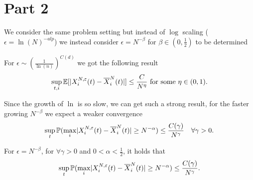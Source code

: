 \section{Part 2}
We consider the same problem setting but instead of $\log$ scaling ($\epsilon = \ln(N)^{-alp} $) we instead consider $\epsilon = N^{-\beta } $ for $\beta  \in  (0,\frac{1}{2})$ to be determined
\begin{remark}
  For $\epsilon \sim (\frac{1}{\ln(n)})^{C(d)} $ we got the following result
 \begin{align*}
   \sup_{t,i} \mathbb{E}[\lvert X^{N,\varepsilon}_i(t) - \overline{X}^{N}_i(t)\rvert ] \le  \frac{C}{N^{\eta } } \text{ for some } \eta  \in (0,1)
 .\end{align*} 
\end{remark}
\begin{remark}
 Since the growth of $\ln $  is so slow, we can get such a strong result, for the faster growing $N^{-\beta } $ we expect a weaker convergence  
 \begin{align*}
   \sup_{t} \mathbb{P}(\max_{i} \lvert X^{N,\varepsilon}_i(t) - \overline{X}_i^{N}(t)   \rvert \ge N^{-\alpha } ) \le \frac{C(\gamma )}{N^{\gamma } } \quad \forall  \gamma  > 0
 .\end{align*}
\end{remark}
\begin{theorem}[$\epsilon = N^{-\beta}$ Convergence]
 For $\epsilon = N^{-\beta } $,  for $\forall  \gamma  > 0$  and $0 < \alpha  < \frac{1}{2}$, it holds that 
 \begin{align*}
   \sup_{t} \mathbb{P}(\max_{i} \lvert X^{N,\varepsilon}_i(t) - \overline{X}_i^{N}(t)   \rvert \ge N^{-\alpha } ) \le \frac{C(\gamma )}{N^{\gamma } } 
 .\end{align*}
\end{theorem}

